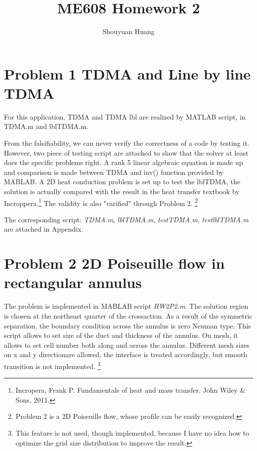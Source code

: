 \documentclass[a4paper,10pt]{report}
\title{ME608 Homework 2}
\author{Shouyuan Huang}
\begin{document}
\maketitle
\section{Problem 1 TDMA and Line by line TDMA}


For this application, TDMA and TDMA lbl are realized by MATLAB script, in TDMA.m and lblTDMA.m. 

From the falsifiability, we can never verify the correctness of a code by testing it. However, two piece of testing script
are attached to show that the solver at least does the specific problems right. A rank 5 linear algebraic equation is made
up and comparison is made between TDMA and inv() function provided by MABLAB. A 2D heat conduction problem is set up to 
test the lblTDMA, the solution is actually compared with the result in the heat transfer textbook by 
Incroppera.\footnote{Incropera, Frank P. Fundamentals of heat and mass transfer. John Wiley \& Sons, 2011.}
The validity is also "varified" through Problem 2. \footnote{Problem 2 is a 2D Poiseuille flow, whose profile can be 
easily recognized. }

The corresponding script: \emph{TDMA.m}, \emph{lblTDMA.m}, \emph{testTDMA.m}, \emph{testlblTDMA.m} are attached in Appendix.



\section{Problem 2 2D Poiseuille flow in rectangular annulus}


The problem is implemented in MABLAB script \emph{HW2P2.m}. The solution region is chosen at the northeast quarter of the 
crossaction. As a result of the symmetric separation, the boundary condition across the annulus is zero Neuman type.  
This script allows to set size of the duct and thickness of the annulus. On mesh, it allows to set cell number both along 
and across the annulus. Different mesh sizes on x and y directionare allowed, the interface is treated accordingly, but 
smooth transition is not implemented. \footnote{This feature is not used, though implemented, because I have no idea 
how to optimize the grid size distribution to improve the result. }
\end{document}
